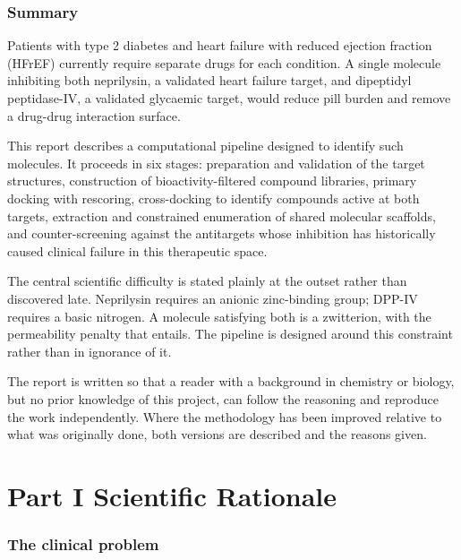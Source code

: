 \documentclass[11pt,a4paper]{article}
\begin{document}
\tableofcontents
\newpage

\section*{Summary}

Patients with type 2 diabetes and heart failure with reduced ejection fraction
(HFrEF) currently require separate drugs for each condition. A single molecule
inhibiting both neprilysin, a validated heart failure target, and dipeptidyl
peptidase-IV, a validated glycaemic target, would reduce pill burden and remove
a drug-drug interaction surface.

This report describes a computational pipeline designed to identify such
molecules. It proceeds in six stages: preparation and validation of the target
structures, construction of bioactivity-filtered compound libraries, primary
docking with rescoring, cross-docking to identify compounds active at both
targets, extraction and constrained enumeration of shared molecular scaffolds,
and counter-screening against the antitargets whose inhibition has historically
caused clinical failure in this therapeutic space.

The central scientific difficulty is stated plainly at the outset rather than
discovered late. Neprilysin requires an anionic zinc-binding group; DPP-IV
requires a basic nitrogen. A molecule satisfying both is a zwitterion, with the
permeability penalty that entails. The pipeline is designed around this
constraint rather than in ignorance of it.

The report is written so that a reader with a background in chemistry or
biology, but no prior knowledge of this project, can follow the reasoning and
reproduce the work independently. Where the methodology has been improved
relative to what was originally done, both versions are described and the
reasons given.

\newpage
\part*{Part I \quad Scientific Rationale}

\section{The clinical problem}
\end{document}
